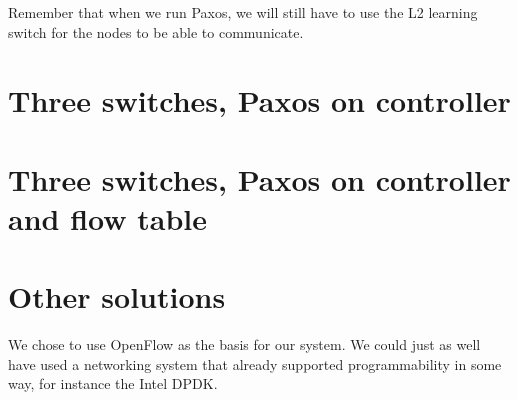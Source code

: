 Remember that when we run Paxos, we will still have to use the L2 learning
switch for the nodes to be able to communicate.


\section{Three switches, Paxos on controller}


\section{Three switches, Paxos on controller and flow table}


\section{Other solutions}

We chose to use OpenFlow as the basis for our system.
We could just as well have used a networking system that already supported
programmability in some way, for instance the Intel DPDK.

